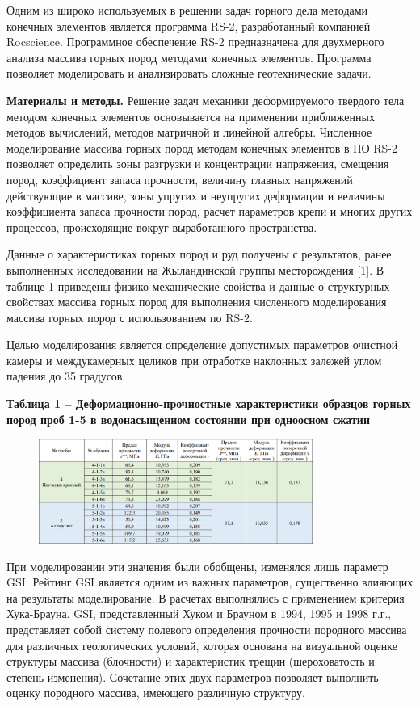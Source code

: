 \begin{multicols}{2}
Одним из широко используемых в решении задач горного дела методами
конечных элементов является программа RS-2, разработанный компанией
Rocscience. Программное обеспечение RS-2 предназначена для двухмерного
анализа массива горных пород методами конечных элементов. Программа
позволяет моделировать и анализировать сложные геотехнические задачи.

{\bfseries Материалы и методы.} Решение задач механики деформируемого
твердого тела методом конечных элементов основывается на применении
приближенных методов вычислений, методов матричной и линейной алгебры.
Численное моделирование массива горных пород методам конечных элементов
в ПО RS-2 позволяет определить зоны разгрузки и концентрации напряжения,
смещения пород, коэффициент запаса прочности, величину главных
напряжений действующие в массиве, зоны упругих и неупругих деформации и
величины коэффициента запаса прочности пород, расчет параметров крепи и
многих других процессов, происходящие вокруг выработанного пространства.

Данные о характеристиках горных пород и руд получены с результатов,
ранее выполненных исследовании на Жыландинской группы месторождения
{[}1{]}. В таблице 1 приведены физико-механические свойства и данные о
структурных свойствах массива горных пород для выполнения численного
моделирования массива горных пород с использованием по RS-2.

Целью моделирования является определение допустимых параметров очистной
камеры и междукамерных целиков при отработке наклонных залежей углом
падения до 35 градусов.
\end{multicols}

{\bfseries Таблица 1 -- Деформационно-прочностные характеристики образцов
горных пород проб 1-5 в водонасыщенном состоянии при одноосном сжатии}

\begin{figure}[H]
	\centering
	\includegraphics[width=0.8\textwidth]{assets/281}
	\caption*{}
\end{figure}

При моделировании эти значения были обобщены, изменялся лишь параметр
GSI. Рейтинг GSI является одним из важных параметров, существенно
влияющих на результаты моделирование. В расчетах выполнялись с
применением критерия Хука-Брауна. GSI, представленный Хуком и Брауном в
1994, 1995 и 1998 г.г., представляет собой систему полевого определения
прочности породного массива для различных геологических условий, которая
основана на визуальной оценке структуры массива (блочности) и
характеристик трещин (шероховатость и степень изменения). Сочетание этих
двух параметров позволяет выполнить оценку породного массива, имеющего
различную структуру.

